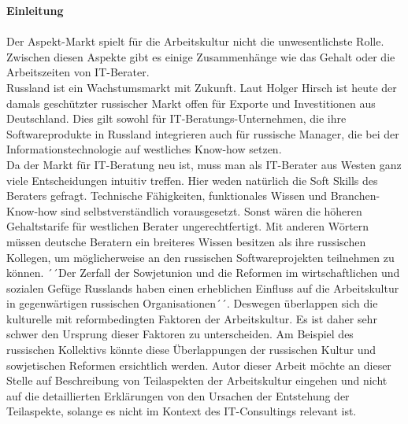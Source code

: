 	
	\textbf{Einleitung}\\ \\
	Der Aspekt-Markt spielt für die Arbeitskultur nicht die unwesentlichste Rolle. Zwischen diesen Aspekte gibt es einige Zusammenhänge wie das Gehalt oder die Arbeitszeiten von IT-Berater.\\
	Russland ist ein Wachstumsmarkt mit Zukunft. Laut Holger Hirsch ist heute der damals geschützter russischer Markt offen für Exporte und Investitionen aus Deutschland. Dies gilt sowohl für IT-Beratungs-Unternehmen, die ihre Softwareprodukte in Russland integrieren auch für russische Manager, die bei der Informationstechnologie auf westliches Know-how setzen.\cite{ITConsRu}\\
	Da der Markt für IT-Beratung neu ist, muss man als IT-Berater aus Westen ganz viele Entscheidungen intuitiv treffen. Hier weden natürlich die Soft Skills des Beraters gefragt. Technische Fähigkeiten, funktionales Wissen und Branchen-Know-how sind selbstverständlich vorausgesetzt. Sonst wären die höheren Gehaltstarife für westlichen Berater ungerechtfertigt. Mit anderen Wörtern müssen deutsche Beratern ein breiteres Wissen besitzen als ihre russischen Kollegen, um möglicherweise an den russischen Softwareprojekten teilnehmen zu können. ´´Der Zerfall der Sowjetunion und die Reformen im wirtschaftlichen und sozialen Gefüge Russlands haben einen erheblichen Einfluss auf die Arbeitskultur in gegenwärtigen russischen Organisationen´´\cite{ProzessbeglBerRU}.
	Deswegen überlappen sich die kulturelle mit reformbedingten Faktoren der Arbeitskultur. Es ist daher sehr schwer den Ursprung dieser Faktoren zu unterscheiden. Am Beispiel des russischen Kollektivs könnte diese Überlappungen der russischen Kultur und sowjetischen Reformen ersichtlich werden. Autor dieser Arbeit möchte an dieser Stelle auf Beschreibung von Teilaspekten der Arbeitskultur eingehen und nicht auf die detaillierten Erklärungen von den Ursachen der Entstehung der Teilaspekte, solange es nicht im Kontext des IT-Consultings relevant ist.\\ \\

